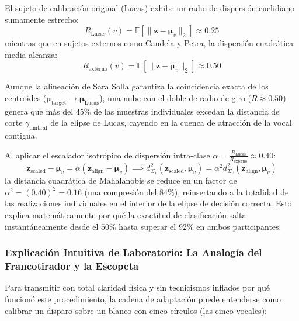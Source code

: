 \documentclass[11pt,a4paper,openany]{book}
\theoremstyle{definition}
\begin{document}
El sujeto de calibración original (Lucas) exhibe un radio de dispersión euclidiano sumamente estrecho:
\begin{equation}
R_{\text{Lucas}}(v) = \mathbb{E}\left[ \|\mathbf{z} - \boldsymbol{\mu}_v\|_2 \right] \approx 0.25
\end{equation}
mientras que en sujetos externos como Candela y Petra, la dispersión cuadrática media alcanza:
\begin{equation}
R_{\text{externo}}(v) = \mathbb{E}\left[ \|\mathbf{z} - \boldsymbol{\mu}_v\|_2 \right] \approx 0.50
\end{equation}

Aunque la alineación de Sara Solla garantiza la coincidencia exacta de los centroides ($\boldsymbol{\mu}_{\text{target}} \to \boldsymbol{\mu}_{\text{Lucas}}$), una nube con el doble de radio de giro ($R \approx 0.50$) genera que más del $45\%$ de las muestras individuales excedan la distancia de corte $\gamma_{\text{umbral}}$ de la elipse de Lucas, cayendo en la cuenca de atracción de la vocal contigua. 

Al aplicar el escalador isotrópico de dispersión intra-clase $\alpha = \frac{R_{\text{Lucas}}}{R_{\text{externo}}} \approx 0.40$:
\begin{equation}
\mathbf{z}_{\text{scaled}} - \boldsymbol{\mu}_v = \alpha (\mathbf{z}_{\text{align}} - \boldsymbol{\mu}_v) \implies d_{\Sigma_v}^2(\mathbf{z}_{\text{scaled}}, \boldsymbol{\mu}_v) = \alpha^2 d_{\Sigma_v}^2(\mathbf{z}_{\text{align}}, \boldsymbol{\mu}_v)
\end{equation}
la distancia cuadrática de Mahalanobis se reduce en un factor de $\alpha^2 = (0.40)^2 = 0.16$ (una compresión del $84\%$), reinsertando a la totalidad de las realizaciones individuales en el interior de la elipse de decisión correcta. Esto explica matemáticamente por qué la exactitud de clasificación salta instantáneamente desde el $50\%$ hasta superar el $92\%$ en ambos participantes.

\subsubsection{Explicación Intuitiva de Laboratorio: La Analogía del Francotirador y la Escopeta}
\label{subsubsec:explicacion_intuitiva_criolla}

Para transmitir con total claridad física y sin tecnicismos inflados por qué funcionó este procedimiento, la cadena de adaptación puede entenderse como calibrar un disparo sobre un blanco con cinco círculos (las cinco vocales):
\end{document}
